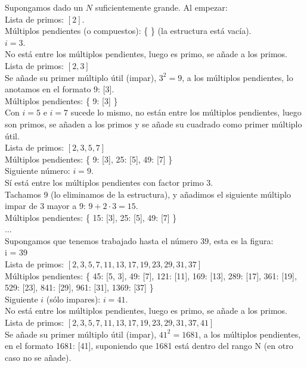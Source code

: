 \begin{ejemplo} Supongamos dado un $N$ suficientemente grande. Al empezar: \\
Lista de primos: $[2]$. \\
Múltiplos pendientes (o compuestos):
\{ \} (la estructura está vacía).\\
$i = 3$. \\
No está entre los múltiplos pendientes, luego es primo, se añade a los primos. \\
Lista de primos: $[2, 3]$ \\
Se añade su primer múltiplo útil (impar), $3^2 = 9$, a los múltiplos pendientes, lo anotamos en el formato 9: [3]. \\
Múltiplos pendientes: \{ 9: [3] \} \\
Con $i = 5$ e $i = 7$ sucede lo mismo, no están entre los múltiplos pendientes, luego son primos, se añaden a los primos y se añade su cuadrado como primer múltiplo útil. \\
Lista de primos: $[2, 3, 5, 7]$ \\
Múltiplos pendientes: \{ 9: [3], 25: [5], 49: [7] \} \\
Siguiente número: $i = 9$. \\
Sí está entre los múltiplos pendientes con factor primo $3$. \\
Tachamos 9 (lo eliminamos de la estructura), y añadimos el siguiente múltiplo impar de $3$ mayor a 9: $9+2\cdot3=15$. \\
Múltiplos pendientes: \{ 15: [3], 25: [5], 49: [7] \} \\
$\dots$ \\
Supongamos que tenemos trabajado hasta el número 39, esta es la figura: \\
i = 39 \\     
Lista de primos: $[2, 3, 5, 7, 11, 13, 17, 19, 23, 29, 31, 37]$ \\
Múltiplos pendientes:
\{ 45: [5, 3], 49: [7], 121: [11], 169: [13], 289: [17], 361: [19], 529: [23], 841: [29], 961: [31], 1369: [37] \} \\
Siguiente $i$ (sólo impares): $i = 41$. \\
No está entre los múltiplos pendientes, luego es primo, se añade a los primos. \\
Lista de primos: $[2, 3, 5, 7, 11, 13, 17, 19, 23, 29, 31, 37, 41]$ \\
Se añade su primer múltiplo útil (impar), $41^2 = 1681$, a los múltiplos pendientes, en el formato 1681: [41], suponiendo que 1681 está dentro del rango N (en otro caso no se añade). \\

\end{ejemplo}
